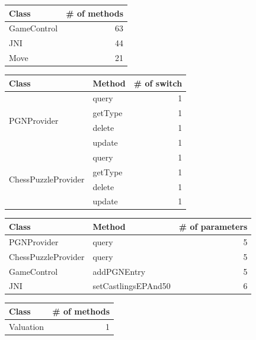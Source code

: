 \documentclass [14 pt]{article}
\begin{document}
\begin{table}[h]
\centering
\begin{tabular}{|l  r|}
\hline
\textbf{Class}		&  \textbf{\# of methods}	\\ \hline\hline
GameControl 			&	63	\\
JNI		 			&	44	\\
Move	 			&	21	\\
\hline
\end{tabular}
\label{tab:LargeClass}
\end{table}

\begin{table}[h]
\centering
\begin{tabular}{|l  l r|}
\hline
\textbf{Class}		&  \textbf{Method}	&  \textbf{\# of switch}	\\ \hline\hline
\multirow{4}{*}{PGNProvider}
	&	query				&	1	\\
	&	getType				&	1	\\ 
	&	delete				&	1	\\ 
	&	update				&	1	\\ \hline
\multirow{4}{*}{ChessPuzzleProvider}
	&	query				&	1	\\
	&	getType				&	1	\\ 
	&	delete				&	1	\\ 
	&	update				&	1	\\ \hline
\end{tabular}
\label{tab:MethodWithSwitch}
\end{table}


\begin{table}[H]
\centering
\begin{tabular}{|l  l r|}
\hline
\textbf{Class}		&  \textbf{Method}	&  \textbf{\# of parameters}	\\ \hline\hline
PGNProvider			&	query				&	5	\\ \hline
ChessPuzzleProvider	&	query				&	5	\\ \hline
GameControl			&	addPGNEntry			&	5	\\ \hline
JNI					&	setCastlingsEPAnd50	&	6	\\ \hline
\end{tabular}
\label{tab:MethodWithLongParameterList}
\end{table}

\begin{table}[H]
\centering
\begin{tabular}{|l  r|}
\hline
\textbf{Class}		&  \textbf{\# of methods}	\\ \hline\hline
Valuation 			&	1	\\
\hline
\end{tabular}
\label{tab:DataClass}
\end{table}
\end{document}
